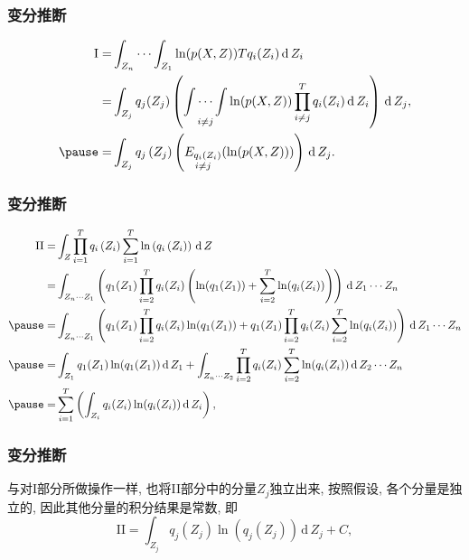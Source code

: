 \documentclass[10pt]{beamer}
\begin{document}
{\begin{frame}[c]
    \frametitle{变分推断}
    \begin{equation}
    \label{equ:VB-partI}
        \begin{aligned}
            \text{I}=&\int_{Z_n}\cdots\int_{Z_1}\ln(p(X,Z))Tq_i(Z_i)\,\text{d}\,Z_i\\
            =&\int_{Z_j}q_j(Z_j)\left(\underset{i\not=j}{\int\cdots\int}\ln(p(X,Z))\prod_{i\not=j}^Tq_i(Z_i)\,\text{d}\,Z_i\right)\,\text{d}\,Z_j, \\
            \pause=&\int_{Z_{j}} q_{j}\left(Z_{j}\right)\left(\underset{i\not=j}{E_{q_i(Z_i)}}(\ln (p(X, Z)))\right) \,\text{d}\, Z_{j}. 
        \end{aligned}
    \end{equation}
\end{frame}

\begin{frame}[c]
    \frametitle{变分推断}
    {\small
    \begin{equation*}
        \begin{aligned}
            \text{II}=&\int_Z \prod_{i=1}^{T} q_{i}\left(Z_{i}\right) \sum_{i=1}^{T} \ln \left(q_{i}\left(Z_{i}\right)\right) \,\text{d}\, Z\\
            =&\int_{Z_n\cdots Z_1}\left(q_1(Z_1)\prod_{i=2}^Tq_i(Z_i)\left(\ln(q_1(Z_1))+\sum_{i=2}^T\ln(q_i(Z_i))\right)\right)\,\text{d}\,Z_1\cdots Z_n\\\pause
            =&\int_{Z_n\cdots Z_1}\left(q_1(Z_1)\prod_{i=2}^Tq_i(Z_i)\ln(q_1(Z_1))+q_1(Z_1)\prod_{i=2}^Tq_i(Z_i)\sum_{i=2}^T\ln(q_i(Z_i))\right)\,\text{d}\,Z_1\cdots Z_n\\\pause
            =&\int_{Z_1}q_1(Z_1)\ln(q_1(Z_1))\,\text{d}\,Z_1+\int_{Z_n\cdots Z_2}\prod_{i=2}^Tq_i(Z_i)\sum_{i=2}^T\ln(q_i(Z_i))\,\text{d}\,Z_2\cdots Z_n\\\pause
            =&\sum_{i=1}^T\left(\int_{Z_i}q_i(Z_i)\ln(q_i(Z_i))\,\text{d}\,Z_i\right), 
        \end{aligned}
    \end{equation*}}
\end{frame}

\begin{frame}[c]
    \frametitle{变分推断}
    与对I部分所做操作一样, 也将II部分中的分量$Z_j$独立出来, 按照假设, 各个分量是独立的, 因此其他分量的积分结果是常数, 即
    \begin{equation}
        \label{equ:VB-partII}
        \text{II}=\int_{Z_j}q_j(Z_j)\ln(q_j(Z_j))\,\text{d}\,Z_j+C, 
    \end{equation}


\end{frame}}
\end{document}
